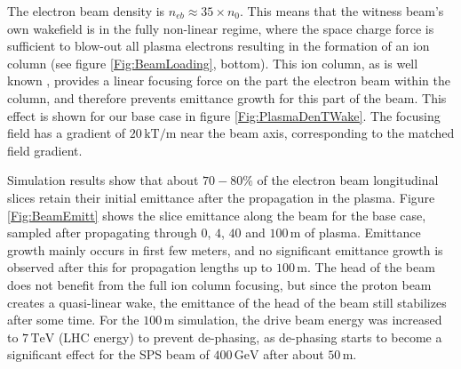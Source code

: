 \documentclass[aps,prstab,reprint,amsmath,amssymb,groupedaddress]{revtex4-1}
\newcommand{\unit}[1]{\,\mathrm{#1}}
\begin{document}
The electron beam density is $n_{eb} \approx 35\times n_{0}$. This means that the witness beam's own wakefield is in the
fully non-linear regime, where the space charge force is sufficient to blow-out all plasma electrons resulting in the
formation of an ion column (see figure \ref{Fig:BeamLoading}, bottom). This ion column, as is well known
\cite{rosenzweig:1991}, provides a linear focusing force on the part the electron beam within the column, and therefore
prevents emittance growth for this part of the beam.  This effect is shown for our base case in figure
\ref{Fig:PlasmaDenTWake}. The focusing field has a gradient of $20\unit{kT/m}$ near the beam axis, corresponding to the
matched field gradient.


Simulation results show that about $70-80\%$ of the electron beam longitudinal slices retain their initial emittance
after the propagation in the plasma. Figure \ref{Fig:BeamEmitt} shows the slice emittance along the beam for the base
case, sampled after propagating through $0$, $4$, $40$ and $100\unit{m}$ of plasma. Emittance growth mainly occurs in
first few meters, and no significant emittance growth is observed after this for propagation lengths up to
$100\unit{m}$. The head of the beam does not benefit from the full ion column focusing, but since the proton beam
creates a quasi-linear wake, the emittance of the head of the beam still stabilizes after some time. For the
$100\unit{m}$ simulation, the drive beam energy was increased to $7\unit{TeV}$ (LHC energy) to prevent de-phasing, as
de-phasing starts to become a significant effect for the SPS beam of $400\unit{GeV}$ after about $50\unit{m}$.
\end{document}
